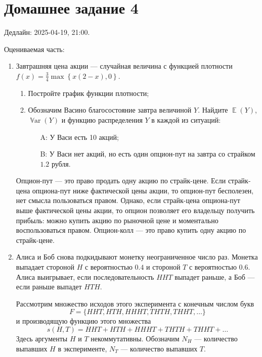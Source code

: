 \documentclass[12pt]{article}
\DeclareMathOperator{\Var}{\mathbb{V}ar}
\DeclareMathOperator{\E}{\mathbb{E}}
\begin{document}
\section*{Домашнее задание 4}

Дедлайн: 2025-04-19, 21:00.

Оцениваемая часть:

\begin{enumerate}
    \item Завтрашняя цена акции — случайная величина с функцией плотности  $f(x)=\frac{3}{4}
    \max \left\{x (2-x), 0 \right\}$.
    \begin{enumerate}
    \item Постройте график функции плотности;
    \item Обозначим Васино благосостояние завтра величиной $Y$. 
    Найдите $\E(Y)$, $\Var(Y)$ и функцию распределения $Y$ в каждой из ситуаций:
    \begin{enumerate}
    \item[A:] У Васи есть 10 акций;
    \item[B:] У Васи нет акций, но есть один опцион-пут на завтра со страйком $1.2$ рубля. 
    \end{enumerate}
    \end{enumerate}
    Опцион-пут — это право продать одну акцию по страйк-цене. 
    Если страйк-цена опциона-пут ниже фактической цены акции, то опцион-пут бесполезен, нет смысла пользоваться правом. 
    Однако, если страйк-цена опциона-пут выше фактической цены акции, то опцион позволяет его владельцу получить прибыль: можно купить акцию по рыночной цене и моментально воспользоваться правом.  
    Опцион-колл — это право купить одну акцию по страйк-цене. 


    \item Алиса и Боб снова подкидывают монетку неограниченное число раз. 
Монетка выпадает стороной $H$ с вероятностью $0.4$ и стороной $T$ с вероятностью $0.6$.
Алиса выигрывает, если последовательность $HHT$ выпадет раньше, а Боб — если раньше выпадет $HTH$.

Рассмотрим множество исходов этого эксперимента с конечным числом букв 
\[
F = \{HHT, HTH, HHHT, THTH, THHT, \dots \}
\]
и производящую функцию этого множества 
\[
s(H, T) = HHT + HTH + HHHT + THTH + THHT + \dots
\]
Здесь аргументы $H$ и $T$ некоммутативны. 
Обозначим $N_H$ — количество выпавших $H$ в эксперименте, $N_T$ — количество выпавших $T$.


\end{enumerate}
\end{document}
